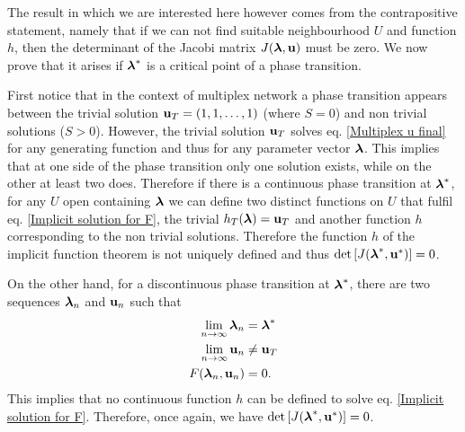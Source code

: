\documentclass[a4paper]{article}
\begin{document}
The result in which we are interested here however comes from the contrapositive statement, namely that if we can not find suitable neighbourhood $U$ and function $h$, then the determinant of the Jacobi matrix $J(\boldsymbol{\mathrm{\lambda}}, \boldsymbol{\mathrm{u}})$ must be zero. We now prove that it arises if $\boldsymbol{\mathrm{\lambda}}^*$ is a critical point of a phase transition.

First notice that in the context of multiplex network a phase transition appears between the trivial solution $\boldsymbol{\mathrm{u}}_T = (1, 1, \dots, 1)$ (where $S = 0$) and non trivial solutions ($S > 0$). However, the trivial solution $\boldsymbol{\mathrm{u}}_T$ solves eq. \eqref{Multiplex u final} for any generating function and thus for any parameter vector $\boldsymbol{\mathrm{\lambda}}$. This implies that at one side of the phase transition only one solution exists, while on the other at least two does. Therefore if there is a continuous phase transition at $\boldsymbol{\mathrm{\lambda}}^*$, for any $U$ open containing $\boldsymbol{\mathrm{\lambda}}$ we can define two distinct functions on $U$ that fulfil eq. \eqref{Implicit solution for F}, the trivial $h_T(\boldsymbol{\mathrm{\lambda}}) = \boldsymbol{\mathrm{u}}_T$ and another function $h$ corresponding to the non trivial solutions. Therefore the function $h$ of the implicit function theorem is not uniquely defined and thus $\det\left[ J(\boldsymbol{\mathrm{\lambda}}^*, \boldsymbol{\mathrm{u}}^*) \right] = 0$.

\begin{figure}
\end{figure}

On the other hand, for a discontinuous phase transition at $\boldsymbol{\mathrm{\lambda}}^*$, there are two sequences $\boldsymbol{\mathrm{\lambda}}_n$ and $\boldsymbol{\mathrm{u}}_n$ such that
\begin{align}
	\lim_{n \rightarrow \infty} \boldsymbol{\mathrm{\lambda}}_n &= \boldsymbol{\mathrm{\lambda}}^* \\
	\lim_{n \rightarrow \infty} \boldsymbol{\mathrm{u}}_n &\neq \boldsymbol{\mathrm{u}}_T \\
	F(\boldsymbol{\mathrm{\lambda}}_n, \boldsymbol{\mathrm{u}}_n) &= 0.
\end{align}
This implies that no continuous function $h$ can be defined to solve eq. \eqref{Implicit solution for F}. Therefore, once again, we have $\det\left[ J(\boldsymbol{\mathrm{\lambda}}^*, \boldsymbol{\mathrm{u}}^*) \right] = 0$.
\end{document}
